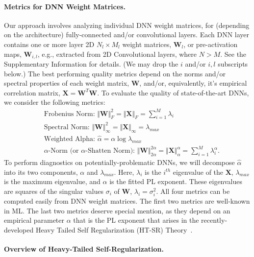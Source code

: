 \paragraph{Metrics for DNN Weight Matrices.}

Our approach involves analyzing individual DNN weight matrices, for (depending on the architecture) fully-connected and/or convolutional layers.
Each DNN layer contains one or more layer 2D  $N_{l}\times M_{l}$ weight matrices, $\mathbf{W}_{l}$, or pre-activation maps, $\mathbf{W}_{i,l}$, e.g., extracted from 2D Convolutional layers, where $N > M$.
See the Supplementary Information
for details.
(We may drop the $i$ and/or $i,l$ subscripts below.)
The best performing quality metrics depend on the norms and/or spectral properties of each weight matrix,
$\mathbf{W}$, and/or, equivalently, it's empirical correlation matrix, $\mathbf{X}=\mathbf{W}^{T}\mathbf{W}$.
To evaluate the quality of state-of-the-art DNNs, 
we consider the following metrics:
\begin{eqnarray}
& & \text{Frobenius Norm: $\Vert\mathbf{W}\Vert^{2}_{F}=\Vert\mathbf{X}\Vert_{F}=\sum\nolimits_{i=1}^{M} \lambda_{i}$ } \\
& & \text{Spectral Norm: $\Vert\mathbf{W}\Vert_{\infty}^{2}=\Vert\mathbf{X}\Vert_{\infty}=\lambda_{max}$ } \\
& & \text{Weighted Alpha: $\hat{\alpha}=\alpha\log\lambda_{max}$ } \\
& & \text{$\alpha$-Norm (or $\alpha$-Shatten Norm): $\Vert\mathbf{W}\Vert^{2\alpha}_{2\alpha}=\Vert\mathbf{X}\Vert^{\alpha}_{\alpha}=\sum\nolimits_{i=1}^{M}\lambda_{i}^{\alpha}$. }
\end{eqnarray}
To perform diagnostics on potentially-problematic DNNs,
we will decompose $\hat{\alpha}$ into its two components, $\alpha$ and $\lambda_{max}$.
Here, $\lambda_{i}$ is the $i^{th}$ eigenvalue of the $\mathbf{X}$, $\lambda_{max}$ is the maximum eigenvalue, and $\alpha$ is the fitted PL exponent. 
These eigenvalues are squares of the singular values $\sigma_{i}$ of $\mathbf{W}$, $\lambda_{i}=\sigma^{2}_{i}$.
All four metrics can be computed easily from DNN weight matrices.
The first two metrics are well-known in ML.
The last two metrics deserve special mention, as they depend on an empirical parameter $\alpha$ that is the PL exponent that arises in the recently-developed Heavy Tailed Self Regularization (HT-SR) Theory~\cite{MM18_TR, MM19_HTSR_ICML, MM20_SDM}.


\paragraph{Overview of Heavy-Tailed Self-Regularization.}

